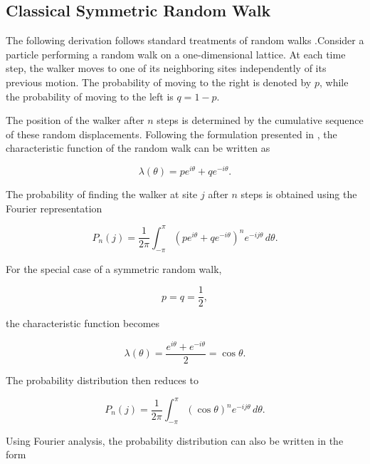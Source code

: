 \subsection{Classical Symmetric Random Walk}

The following derivation follows standard treatments of random walks
\cite{klafter2011,resnick1992}.Consider a particle performing a random walk on a one-dimensional lattice\cite{klafter2011,resnick1992}. At each time step, the walker moves to one of its neighboring sites independently of its previous motion. The probability of moving to the right is denoted by $p$, while the probability of moving to the left is $q = 1-p$.

The position of the walker after $n$ steps is determined by the cumulative sequence of these random displacements. Following the formulation presented in \cite{klafter2011}, the characteristic function of the random walk can be written as

\begin{equation}
\lambda(\theta)=pe^{i\theta}+qe^{-i\theta}.
\end{equation}

The probability of finding the walker at site $j$ after $n$ steps is obtained using the Fourier representation\cite{klafter2011}

\begin{equation}
P_n(j)
=
\frac{1}{2\pi}
\int_{-\pi}^{\pi}
\left(
pe^{i\theta}+qe^{-i\theta}
\right)^n
e^{-ij\theta}
\, d\theta.
\end{equation}

For the special case of a symmetric random walk,

\begin{equation}
p=q=\frac{1}{2},
\end{equation}

the characteristic function becomes

\begin{equation}
\lambda(\theta)
=
\frac{e^{i\theta}+e^{-i\theta}}{2}
=
\cos\theta.
\end{equation}

The probability distribution then reduces to

\begin{equation}
P_n(j)
=
\frac{1}{2\pi}
\int_{-\pi}^{\pi}
(\cos\theta)^n
e^{-ij\theta}
\, d\theta.
\end{equation}

Using Fourier analysis, the probability distribution can also be written in the form

